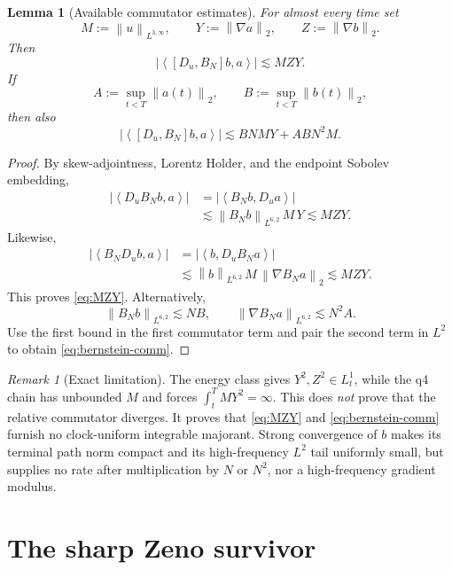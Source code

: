 \documentclass[11pt]{article}
\newtheorem{lemma}[theorem]{Lemma}
\theoremstyle{remark}
\newtheorem{remark}[theorem]{Remark}
\newcommand{\norm}[1]{\left\|#1\right\|}
\newcommand{\ip}[2]{\left\langle #1,#2\right\rangle}
\begin{document}
\begin{lemma}[Available commutator estimates]
\label{lem:commutator}
For almost every time set
\[
 M:=\norm{u}_{L^{3,\infty}},\qquad
 Y:=\norm{\nabla a}_2,\qquad
 Z:=\norm{\nabla b}_2.
\]
Then
\begin{equation}
\label{eq:MZY}
 \left|\ip{[D_u,B_N]b}{a}\right|
 \lesssim MZY.
\end{equation}
If
\[
 A:=\sup_{t<T}\norm{a(t)}_2,\qquad
 B:=\sup_{t<T}\norm{b(t)}_2,
\]
then also
\begin{equation}
\label{eq:bernstein-comm}
 \left|\ip{[D_u,B_N]b}{a}\right|
 \lesssim BNMY+ABN^2M.
\end{equation}
\end{lemma}

\begin{proof}
By skew-adjointness, Lorentz Holder, and the endpoint Sobolev embedding,
\[
 \begin{aligned}
 |\ip{D_uB_Nb}{a}|
 &=
 |\ip{B_Nb}{D_ua}|\\
 &\lesssim
 \norm{B_Nb}_{L^{6,2}}\,M\,Y
 \lesssim MZY.
 \end{aligned}
\]
Likewise,
\[
 \begin{aligned}
 |\ip{B_ND_ub}{a}|
 &=
 |\ip{b}{D_uB_Na}|\\
 &\lesssim
 \norm{b}_{L^{6,2}}\,M\,\norm{\nabla B_Na}_2
 \lesssim MZY.
 \end{aligned}
\]
This proves \eqref{eq:MZY}.  Alternatively,
\[
 \norm{B_Nb}_{L^{6,2}}\lesssim NB,\qquad
 \norm{\nabla B_Na}_{L^{6,2}}\lesssim N^2A.
\]
Use the first bound in the first commutator term and pair the second
term in \(L^2\) to obtain \eqref{eq:bernstein-comm}.
\end{proof}

\begin{remark}[Exact limitation]
The energy class gives \(Y^2,Z^2\in L^1_t\), while the q4 chain has
unbounded \(M\) and forces \(\int_t^TMY^2=\infty\).  This does
\emph{not} prove that the relative commutator diverges.  It proves that
\eqref{eq:MZY} and \eqref{eq:bernstein-comm} furnish no
clock-uniform integrable majorant.  Strong convergence of \(b\) makes
its terminal path norm compact and its high-frequency \(L^2\) tail
uniformly small, but supplies no rate after multiplication by \(N\) or
\(N^2\), nor a high-frequency gradient modulus.
\end{remark}

\section{The sharp Zeno survivor}
\end{document}
